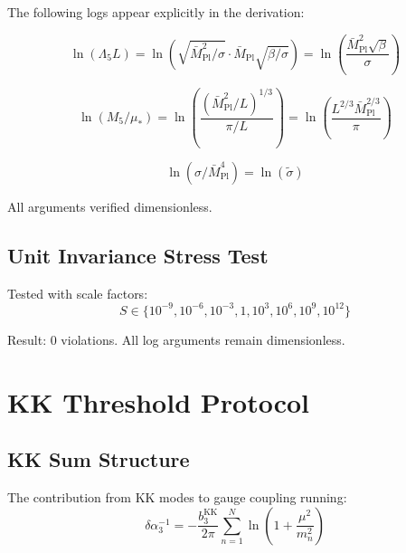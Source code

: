 \documentclass[11pt,a4paper]{article}
\theoremstyle{definition}
\begin{document}
The following logs appear explicitly in the derivation:

\begin{equation}
\label{eq:cutoff-log}
\ln(\Lambda_5 L) = \ln\left(\sqrt{\bar{M}_{\text{Pl}}^2/\sigma} \cdot \bar{M}_{\text{Pl}}\sqrt{\beta/\sigma}\right)
  = \ln\left(\frac{\bar{M}_{\text{Pl}}^2 \sqrt{\beta}}{\sigma}\right)
\end{equation}

\begin{equation}
\label{eq:planck-log}
\ln(M_5/\mu_*) = \ln\left(\frac{(\bar{M}_{\text{Pl}}^2/L)^{1/3}}{\pi/L}\right)
  = \ln\left(\frac{L^{2/3} \bar{M}_{\text{Pl}}^{2/3}}{\pi}\right)
\end{equation}

\begin{equation}
\label{eq:tension-log}
\ln(\sigma/\bar{M}_{\text{Pl}}^4) = \ln(\tilde{\sigma})
\end{equation}

All arguments verified dimensionless.

\subsection{Unit Invariance Stress Test}
\label{subsec:unit-invariance}

\begin{invariancebox}
Tested with scale factors:
\begin{equation}
\label{eq:scale-factors}
S \in \{10^{-9}, 10^{-6}, 10^{-3}, 1, 10^3, 10^6, 10^9, 10^{12}\}
\end{equation}

Result: 0 violations. All log arguments remain dimensionless.
\end{invariancebox}

\section{KK Threshold Protocol}
\label{sec:kk-protocol}

\subsection{KK Sum Structure}
\label{subsec:kk-sum}

The contribution from KK modes to gauge coupling running:
\begin{equation}
\label{eq:kk-sum-form}
\delta\alpha_3^{-1} = -\frac{b_3^{\text{KK}}}{2\pi} \sum_{n=1}^{N} \ln\left(1 + \frac{\mu^2}{m_n^2}\right)
\end{equation}
\end{document}
